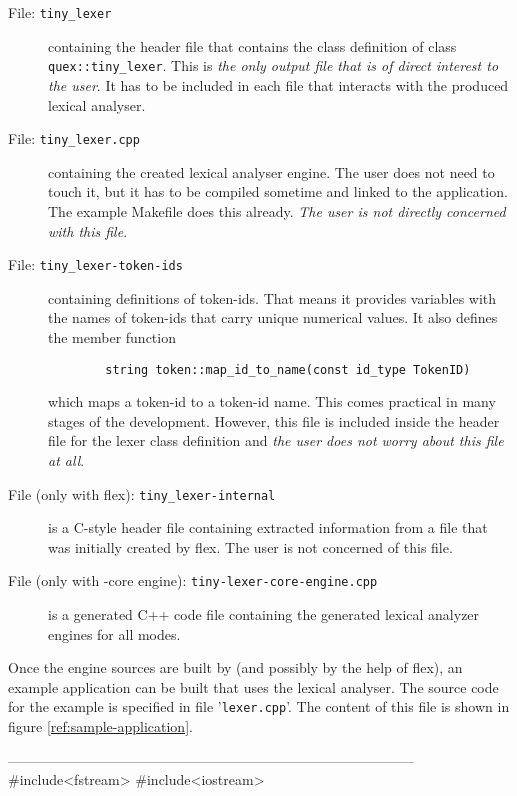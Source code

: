 \begin{description}
\item[File: \tt tiny\_lexer] containing the header file that contains the class
  definition of class {\tt quex::tiny\_lexer}. This is {\it the only output file
  that is of direct interest to the user}. It has to be included in each file
  that interacts with the produced lexical analyser.

\item[File: \tt tiny\_lexer.cpp] containing the created lexical analyser
  engine. The user does not need to touch it, but it has to be compiled
  sometime and linked to the application. The example Makefile does this
  already. {\it The user is not directly concerned with this file}.
  
\item[File: \tt tiny\_lexer-token-ids] containing definitions of token-ids.
  That means it provides variables with the names of token-ids that carry
  unique numerical values. It also defines the member function
  
  \begin{lstlisting}
        string token::map_id_to_name(const id_type TokenID)
  \end{lstlisting}
  which maps a token-id to a token-id name. This comes practical in many
  stages of the development. However, this file is included inside the header
  file for the lexer class definition and {\it the user does not worry
    about this file at all}.
  
\item[File (only with flex): \tt tiny\_lexer-internal] is a C-style header file containing
  extracted information from a file that was initially created by flex. The
  user is not concerned of this file.

\item[File (only with {\quex}-core engine): \tt tiny-lexer-core-engine.cpp] is
  a generated C++ code file containing the generated lexical analyzer engines
  for all modes.  
\end{description}

Once the engine sources are built by {\quex} (and possibly by the help of flex), an
example application can be built that uses the lexical analyser.  The source
code for the example is specified in file '{\tt lexer.cpp}'. The content
of this file is shown in figure \ref{ref:sample-application}.

---------------------------------------------------------------------------------------
#include<fstream>    
#include<iostream> 

